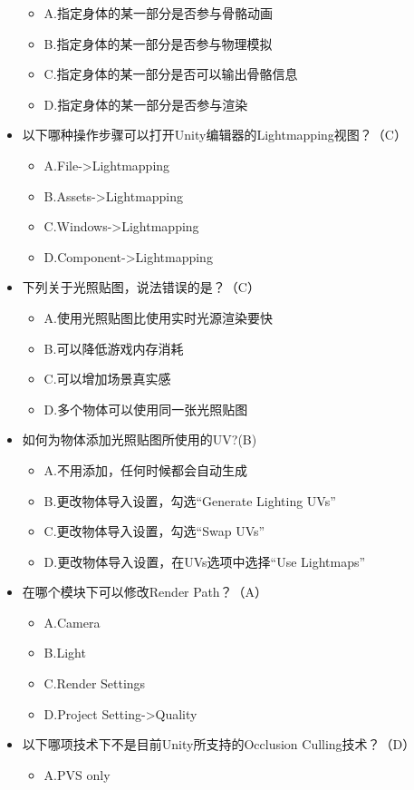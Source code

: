 \documentclass[9pt, b5paper]{article}
\begin{document}
\begin{itemize}
\begin{itemize}
\item A.指定身体的某一部分是否参与骨骼动画
\item B.指定身体的某一部分是否参与物理模拟
\item C.指定身体的某一部分是否可以输出骨骼信息
\item D.指定身体的某一部分是否参与渲染
\end{itemize}
\item 以下哪种操作步骤可以打开Unity编辑器的Lightmapping视图？（C）
\begin{itemize}
\item A.File->Lightmapping
\item B.Assets->Lightmapping
\item C.Windows->Lightmapping
\item D.Component->Lightmapping
\end{itemize}
\item 下列关于光照贴图，说法错误的是？（C）
\begin{itemize}
\item A.使用光照贴图比使用实时光源渲染要快
\item B.可以降低游戏内存消耗
\item C.可以增加场景真实感
\item D.多个物体可以使用同一张光照贴图
\end{itemize}
\item 如何为物体添加光照贴图所使用的UV?(B)
\begin{itemize}
\item A.不用添加，任何时候都会自动生成
\item B.更改物体导入设置，勾选“Generate Lighting UVs”
\item C.更改物体导入设置，勾选“Swap UVs”
\item D.更改物体导入设置，在UVs选项中选择“Use Lightmaps”
\end{itemize}
\item 在哪个模块下可以修改Render Path？（A）
\begin{itemize}
\item A.Camera
\item B.Light
\item C.Render Settings
\item D.Project Setting->Quality
\end{itemize}
\item 以下哪项技术下不是目前Unity所支持的Occlusion Culling技术？（D）
\begin{itemize}
\item A.PVS only

\end{itemize}
\end{itemize}
\end{document}

